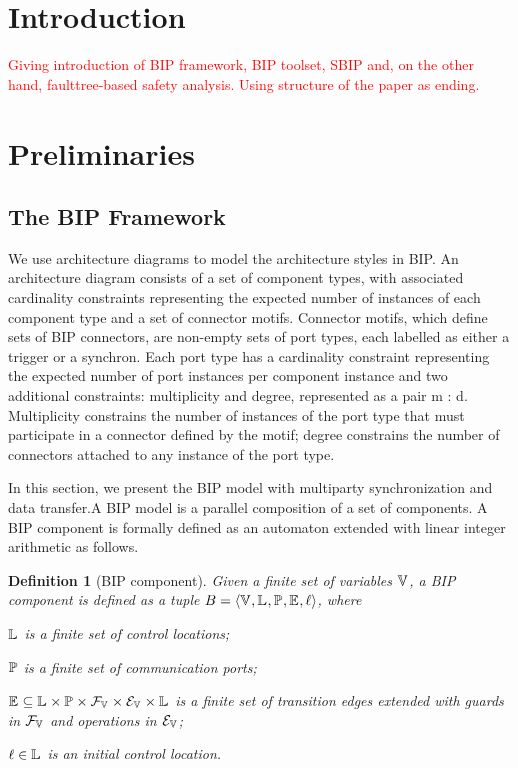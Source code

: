 \documentclass[conference]{IEEEtran}
\newtheorem{definition}{Definition}
\begin{document}
\section{Introduction}
\textcolor{red}{
Giving introduction of BIP framework, BIP toolset, SBIP and, on the other hand, faulttree-based safety analysis. Using structure of the paper as ending.
}

\section{Preliminaries}

\subsection{The BIP Framework}
We use architecture diagrams \cite{} to model the architecture styles in BIP.
An architecture diagram consists of a set of component types, with associated cardinality constraints representing the
expected number of instances of each component type and a set of connector motifs.
Connector motifs, which define sets of BIP connectors, are non-empty sets of port types, each labelled as either a trigger or a synchron.
Each port type has a cardinality constraint representing the expected number of port instances
per component instance and two additional constraints: multiplicity and degree,
represented as a pair m : d. Multiplicity constrains the number of instances of
the port type that must participate in a connector defined by the motif; degree
constrains the number of connectors attached to any instance of the port type.

In this section, we present the BIP model with multiparty synchronization and data transfer.A BIP model is a parallel composition of a set of components.
A BIP component is formally defined as an automaton extended with linear integer arithmetic as follows.

\begin{definition} [BIP component]
	\label{component-def}
	Given a finite set of variables $\mathbb{V}_{}$, a BIP component is defined as a tuple
	$B_{} = \langle{\ensuremath{\mathbb{V}_{}}, \ensuremath{\mathbb{L}_{}}, \ensuremath{\mathbb{P}_{}}, \ensuremath{\mathbb{E}_{}}, \ell}\rangle$, where
	\begin{inparaenum}
		\item $\mathbb{L}_{}$ is a finite set of control locations;
		\item $\mathbb{P}_{}$ is a finite set of communication ports;
		\item $\mathbb{E}_{} \subseteq \mathbb{L}_{} \times \mathbb{P}_{} \times \mathcal{F}_{\mathbb{V}_{}} \times \mathcal{E}_{\mathbb{V}_{}} \times \mathbb{L}_{}$
		is a finite set of transition edges extended with guards in $\mathcal{F}_{\mathbb{V}_{}}$
		and operations in $\mathcal{E}_{\mathbb{V}_{}}$;
		\item $\ell \in \mathbb{L}_{}$ is an initial control location.
	\end{inparaenum}
\end{definition}
\end{document}

